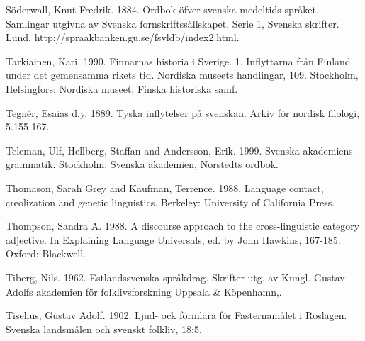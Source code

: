 \begin{styleBodytextC}
Söderwall, Knut Fredrik. 1884. Ordbok öfver svenska medeltids-språket. Samlingar utgivna av Svenska fornskriftssällskapet. Serie 1, Svenska skrifter. Lund. http://spraakbanken.gu.se/fsvldb/index2.html.

\end{styleBodytextC}

\begin{styleBodytextC}
Tarkiainen, Kari. 1990. Finnarnas historia i Sverige. 1, Inflyttarna från Finland under det gemensamma rikets tid. Nordiska museets handlingar, 109. Stockholm, Helsingfors: Nordiska museet; Finska historiska samf.

\end{styleBodytextC}

\begin{styleBodytextC}
Tegnér, Esaias d.y. 1889. Tyska inflytelser på svenskan. Arkiv för nordisk filologi, 5.155-167.

\end{styleBodytextC}

\begin{styleBodytextC}
Teleman, Ulf, Hellberg, Staffan and Andersson, Erik. 1999. Svenska akademiens grammatik. Stockholm: Svenska akademien, Norstedts ordbok.

\end{styleBodytextC}

\begin{styleBodytextC}
Thomason, Sarah Grey and Kaufman, Terrence. 1988. Language contact, creolization and genetic linguistics. Berkeley: University of California Press.

\end{styleBodytextC}

\begin{styleBodytextC}
Thompson, Sandra A. 1988. A discourse approach to the cross-linguistic category {\textquotedbl}adjective{\textquotedbl}. In Explaining Language Universals, ed. by John Hawkins, 167-185. Oxford: Blackwell.

\end{styleBodytextC}

\begin{styleBodytextC}
Tiberg, Nils. 1962. Estlandssvenska språkdrag. Skrifter utg. av Kungl. Gustav Adolfs akademien för folklivsforskning Uppsala \& Köpenhamn,.

\end{styleBodytextC}

\begin{styleBodytextC}
Tiselius, Gustav Adolf. 1902. Ljud- ock formlära för Fasternamålet i Roslagen. Svenska landsmålen och svenskt folkliv, 18:5.

\end{styleBodytextC}

